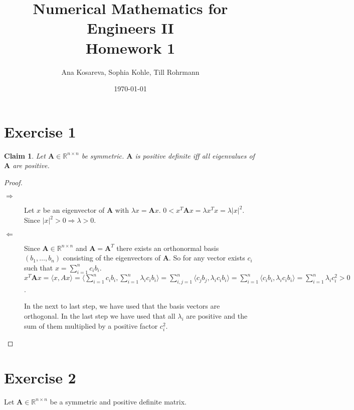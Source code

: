 \documentclass{article}
\title{Numerical Mathematics for Engineers II\\Homework 1}
\author{Ana Kosareva, Sophia Kohle, Till Rohrmann}
\date{\today}
\newtheorem{claim}{Claim}
\begin{document}
\maketitle

\section*{Exercise 1}
	\begin{claim}
		Let $\pmb A \in \mathbb{R}^{n\times n}$ be symmetric. $\pmb A$ is positive definite iff all eigenvalues of $\pmb A$ are positive.
	\end{claim}
	\begin{proof}
		\begin{description}
			\item[$\Rightarrow$] Let $x$ be an eigenvector of $\pmb A$ with $\lambda x = \pmb A x$. $0 < x^{T}\pmb A x = \lambda x^{T}x = \lambda |x|^{2}$. Since $|x|^{2} > 0 \Rightarrow \lambda > 0$.
			\item[$\Leftarrow$] Since $\pmb A \in \mathbb{R}^{n\times n}$ and $\pmb A = \pmb A^{T}$ there exists an orthonormal basis $(b_{1},\ldots, b_{n})$ consisting of the eigenvectors of $\pmb A$. So for any vector exists $c_{i}$ such that $x=\sum_{i=1}^{n}c_{i}b_{i}$. $x^{T}\pmb A x = \langle x,Ax \rangle = \langle \sum_{i=1}^{n}c_{i}b_{i},\sum_{i=1}^{n}\lambda_{i}c_{i}b_{i}\rangle = \sum_{i,j=1}^{n}\langle c_{j}b_{j}, \lambda_{i}c_{i}b_{i} \rangle = \sum_{i=1}^{n} \langle c_{i}b_{i},\lambda_{i}c_{i}b_{i}\rangle = \sum_{i=1}^{n} \lambda_{i} c_{i}^{2} > 0$.
			
			In the next to last step, we have used that the basis vectors are orthogonal. In the last step we have used that all $\lambda_{i}$ are positive and the sum of them multiplied by a positive factor $c_{i}^{2}$.
		\end{description}
	\end{proof}
	
\section*{Exercise 2}
	Let $\pmb A \in \mathbb{R}^{n\times n}$ be a symmetric and positive definite matrix.
\end{document}

